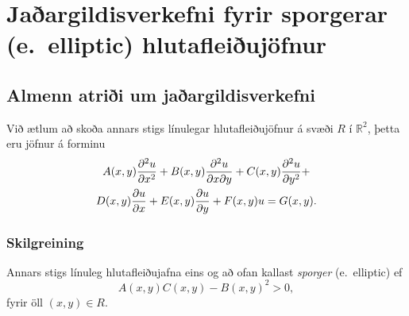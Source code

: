 \documentclass[icelandic,a4paper,12pt]{article}
\newcommand{\R}{{\mathbb  R}}
\begin{document}


\section{Jaðargildisverkefni fyrir sporgerar (e.~elliptic) hlutafleiðujöfnur}



\subsection{Almenn atriði um jaðargildisverkefni}

Við ætlum að skoða annars stigs línulegar hlutafleiðujöfnur á svæði
$R$ í $\R^2$, \pause þetta eru jöfnur á forminu
\begin{multline}
A(x,y)\frac{{\partial}^2 u}{{\partial} x^2} + B(x,y)\frac{{\partial}^2 u}{{\partial} x{\partial} y} + C(x,y)\frac{{\partial}^2 u}{{\partial} y^2} +\\
D(x,y)\frac{{\partial} u}{{\partial} x} + E(x,y)\frac{{\partial} u}{{\partial} y} + F(x,y)u = G(x,y).
\end{multline}
\subsubsection{Skilgreining}
 Annars stigs línuleg hlutafleiðujafna eins og að ofan kallast \emph{sporger}
 (e.~elliptic) ef 
 $$
  A(x,y)C(x,y) - B(x,y)^2 > 0,
 $$
 fyrir öll $(x,y) \in R$.
\end{document}
